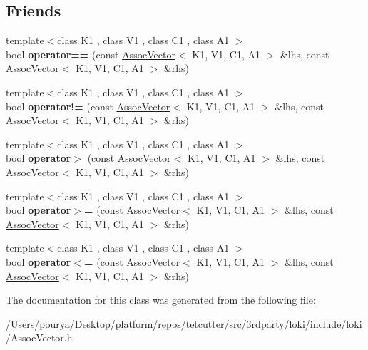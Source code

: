 \subsection*{Friends}
\begin{DoxyCompactItemize}
\item 
\hypertarget{classLoki_1_1AssocVector_a1b3f40762f15fcdb996769f53339715e}{}{\footnotesize template$<$class K1 , class V1 , class C1 , class A1 $>$ }\\bool {\bfseries operator==} (const \hyperlink{classLoki_1_1AssocVector}{Assoc\+Vector}$<$ K1, V1, C1, A1 $>$ \&lhs, const \hyperlink{classLoki_1_1AssocVector}{Assoc\+Vector}$<$ K1, V1, C1, A1 $>$ \&rhs)\label{classLoki_1_1AssocVector_a1b3f40762f15fcdb996769f53339715e}

\item 
\hypertarget{classLoki_1_1AssocVector_a863df9313a141c8f763d30ea1ef690b3}{}{\footnotesize template$<$class K1 , class V1 , class C1 , class A1 $>$ }\\bool {\bfseries operator!=} (const \hyperlink{classLoki_1_1AssocVector}{Assoc\+Vector}$<$ K1, V1, C1, A1 $>$ \&lhs, const \hyperlink{classLoki_1_1AssocVector}{Assoc\+Vector}$<$ K1, V1, C1, A1 $>$ \&rhs)\label{classLoki_1_1AssocVector_a863df9313a141c8f763d30ea1ef690b3}

\item 
\hypertarget{classLoki_1_1AssocVector_adb0079a7b3e672b5b9ccbbf2caf82971}{}{\footnotesize template$<$class K1 , class V1 , class C1 , class A1 $>$ }\\bool {\bfseries operator$>$} (const \hyperlink{classLoki_1_1AssocVector}{Assoc\+Vector}$<$ K1, V1, C1, A1 $>$ \&lhs, const \hyperlink{classLoki_1_1AssocVector}{Assoc\+Vector}$<$ K1, V1, C1, A1 $>$ \&rhs)\label{classLoki_1_1AssocVector_adb0079a7b3e672b5b9ccbbf2caf82971}

\item 
\hypertarget{classLoki_1_1AssocVector_a107e0b23abec9e12d87ff1f9774b46b1}{}{\footnotesize template$<$class K1 , class V1 , class C1 , class A1 $>$ }\\bool {\bfseries operator$>$=} (const \hyperlink{classLoki_1_1AssocVector}{Assoc\+Vector}$<$ K1, V1, C1, A1 $>$ \&lhs, const \hyperlink{classLoki_1_1AssocVector}{Assoc\+Vector}$<$ K1, V1, C1, A1 $>$ \&rhs)\label{classLoki_1_1AssocVector_a107e0b23abec9e12d87ff1f9774b46b1}

\item 
\hypertarget{classLoki_1_1AssocVector_aa090f0b7e523dcb5a7fb619e5a00866d}{}{\footnotesize template$<$class K1 , class V1 , class C1 , class A1 $>$ }\\bool {\bfseries operator$<$=} (const \hyperlink{classLoki_1_1AssocVector}{Assoc\+Vector}$<$ K1, V1, C1, A1 $>$ \&lhs, const \hyperlink{classLoki_1_1AssocVector}{Assoc\+Vector}$<$ K1, V1, C1, A1 $>$ \&rhs)\label{classLoki_1_1AssocVector_aa090f0b7e523dcb5a7fb619e5a00866d}

\end{DoxyCompactItemize}


The documentation for this class was generated from the following file\+:\begin{DoxyCompactItemize}
\item 
/\+Users/pourya/\+Desktop/platform/repos/tetcutter/src/3rdparty/loki/include/loki/Assoc\+Vector.\+h\end{DoxyCompactItemize}
